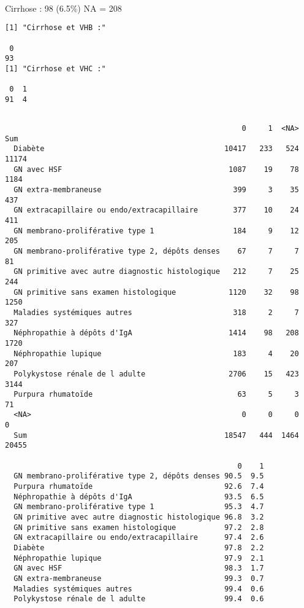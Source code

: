 \documentclass[11pt,a4paper]{article}\usepackage[]{graphicx}\usepackage[]{color}
\makeatletter
\newenvironment{kframe}{%
 \def\at@end@of@kframe{}%
 \ifinner\ifhmode%
  \def\at@end@of@kframe{\end{minipage}}%
  \begin{minipage}{\columnwidth}%
 \fi\fi%
 \def\FrameCommand##1{\hskip\@totalleftmargin \hskip-\fboxsep
 \colorbox{shadecolor}{##1}\hskip-\fboxsep
     \hskip-\linewidth \hskip-\@totalleftmargin \hskip\columnwidth}%
 \MakeFramed {\advance\hsize-\width
   \@totalleftmargin\z@ \linewidth\hsize
   \@setminipage}}%
 {\par\unskip\endMakeFramed%
 \at@end@of@kframe}
\newenvironment{knitrout}{}{} %
\makeatother
\begin{document}
~\\

Cirrhose : 98 (6.5\%) NA = 208

\begin{knitrout}
\color{fgcolor}\begin{kframe}
\begin{verbatim}
[1] "Cirrhose et VHB :"

 0 
93 
[1] "Cirrhose et VHC :"

 0  1 
91  4 
\end{verbatim}
\end{kframe}
\end{knitrout}


\begin{knitrout}
\color{fgcolor}\begin{kframe}
\begin{verbatim}
                                                 
                                                      0     1  <NA>   Sum
  Diabète                                         10417   233   524 11174
  GN avec HSF                                      1087    19    78  1184
  GN extra-membraneuse                              399     3    35   437
  GN extracapillaire ou endo/extracapillaire        377    10    24   411
  GN membrano-proliférative type 1                  184     9    12   205
  GN membrano-proliférative type 2, dépôts denses    67     7     7    81
  GN primitive avec autre diagnostic histologique   212     7    25   244
  GN primitive sans examen histologique            1120    32    98  1250
  Maladies systémiques autres                       318     2     7   327
  Néphropathie à dépôts d'IgA                      1414    98   208  1720
  Néphropathie lupique                              183     4    20   207
  Polykystose rénale de l adulte                   2706    15   423  3144
  Purpura rhumatoïde                                 63     5     3    71
  <NA>                                                0     0     0     0
  Sum                                             18547   444  1464 20455
                                                 
                                                     0    1
  GN membrano-proliférative type 2, dépôts denses 90.5  9.5
  Purpura rhumatoïde                              92.6  7.4
  Néphropathie à dépôts d'IgA                     93.5  6.5
  GN membrano-proliférative type 1                95.3  4.7
  GN primitive avec autre diagnostic histologique 96.8  3.2
  GN primitive sans examen histologique           97.2  2.8
  GN extracapillaire ou endo/extracapillaire      97.4  2.6
  Diabète                                         97.8  2.2
  Néphropathie lupique                            97.9  2.1
  GN avec HSF                                     98.3  1.7
  GN extra-membraneuse                            99.3  0.7
  Maladies systémiques autres                     99.4  0.6
  Polykystose rénale de l adulte                  99.4  0.6
\end{verbatim}
\end{kframe}
\end{knitrout}
\end{document}
